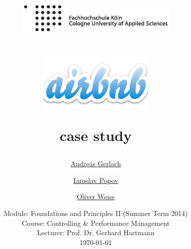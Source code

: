 \documentclass[a4paper]{article}
\begin{document}
	\title{
	\begin{figure}[!ht]
		\flushleft
			\includegraphics[width=0.7\textwidth]{assets/logo.eps}
	\end{figure}
	\vspace{1cm}
    \begin{figure}[!ht]
    	\center
    		\includegraphics[width=0.5\textwidth]{assets/Airbnb_Logo.png}
    \end{figure}
	\Huge case study
	}
	
	\vspace{1cm}
	
	
	\author{\Large \href{mailto:andreas.gerlach@smail.fh-koeln.de}{Andreas Gerlach} \and \Large \href{mailto:iaroslav.popov@gmail.com}{Iaroslav Popov} \and \Large \href{mailto:oweiss@fh-koeln.de}{Oliver Weiss}
	\vspace{1cm}}
	
	\date{
	\large Module: Foundations and Principles II (Summer Term 2014)\\ Course: Controlling \& Performance Management \\ 
	\vspace{0.8cm}
	\large Lecturer: Prof. Dr. Gerhard Hartmann \\
	\vspace{1cm}
	\today
	}

	\maketitle
	\setlength{\parindent}{0pt}












%


 
\end{document}
